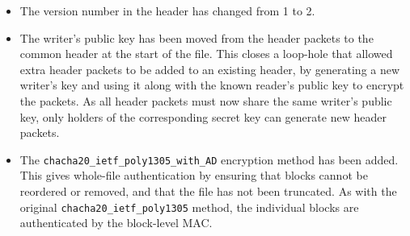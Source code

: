 \documentclass[10pt]{article}
\newcommand{\kw}[1]{\texttt{#1}}
\begin{document}
\begin{itemize}
\item The version number in the header has changed from 1 to 2.

\item The writer's public key has been moved from the header packets to the common header at the start of the file.
This closes a loop-hole that allowed extra header packets to be added to an existing header,
by generating a new writer's key and using it along with the known reader's public key to encrypt the packets.
As all header packets must now share the same writer's public key,
only holders of the corresponding secret key can generate new header packets.

\item The \kw{chacha20\_ietf\_poly1305\_with\_AD} encryption method has been added.
This gives whole-file authentication by ensuring that blocks cannot be reordered or removed,
and that the file has not been truncated.
As with the original \kw{chacha20\_ietf\_poly1305} method,
the individual blocks are authenticated by the block-level MAC.

\end{itemize}
\end{document}
